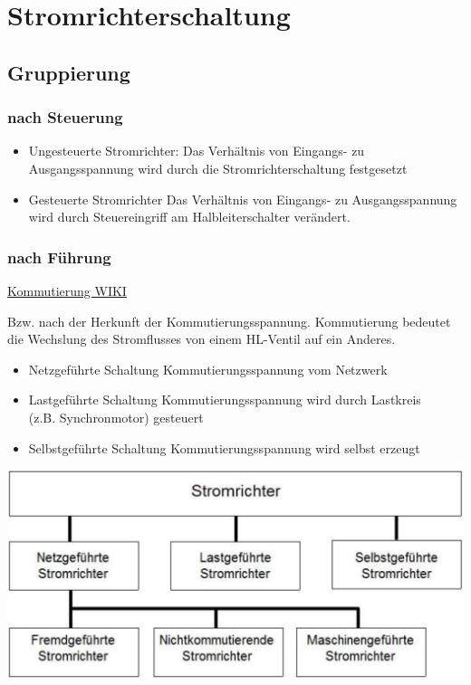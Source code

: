 \section{Stromrichterschaltung}
\subsection{Gruppierung}
\subsubsection{nach Steuerung}
\begin{itemize}
    \item Ungesteuerte Stromrichter:
        \subitem Das Verhältnis von Eingangs- zu Ausgangsspannung wird durch die Stromrichterschaltung festgesetzt
    \item Gesteuerte Stromrichter
        \subitem Das Verhältnis von Eingangs- zu Ausgangsspannung wird durch Steuereingriff am Halbleiterschalter verändert. 
\end{itemize}

\subsubsection{nach Führung}
\href{https://de.wikipedia.org/wiki/Kommutierung}{Kommutierung WIKI}\newline
\begin{minipage}{0.6\linewidth}
Bzw. nach der Herkunft der Kommutierungsspannung.\newline
Kommutierung bedeutet die Wechslung des Stromflusses von einem HL-Ventil auf ein Anderes.
\begin{itemize}
    \item Netzgeführte Schaltung
        \subitem Kommutierungsspannung vom Netzwerk
    \item Lastgeführte Schaltung
        \subitem Kommutierungsspannung wird durch Lastkreis\\
        (z.B. Synchronmotor) gesteuert
    \item Selbstgeführte Schaltung
        \subitem Kommutierungsspannung wird selbst erzeugt
\end{itemize}
\end{minipage}
\begin{minipage}{0.4\linewidth}
    \includegraphics[width=\linewidth]{images/StromrichterKennzeichnung}\newline
\end{minipage}

